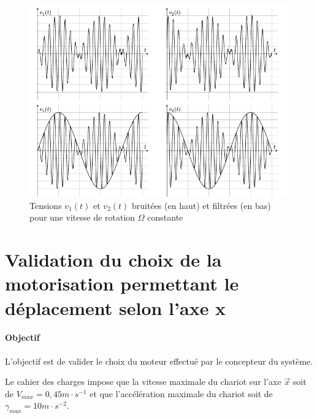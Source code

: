 \begin{figure}[!h]
\centering\includegraphics[width=0.7\linewidth]{img/fig12}
 \caption{Tensions $v_1(t)$ et $v_2(t)$ bruitées (en haut) et filtrées (en bas) pour une vitesse de rotation $\Omega$ constante}
 \label{img12}
\end{figure}



\section{Validation du choix de la motorisation permettant le déplacement selon l’axe x}

\paragraph{Objectif}

L’objectif est de valider le choix du moteur effectué par le concepteur du système.

Le cahier des charges impose que la vitesse maximale du chariot sur l’axe $\overrightarrow{x}$ soit de $V_{max}=0,45 m\cdot s^{-1}$ et que l’accélération maximale du chariot soit de $\gamma_{max}=10m\cdot s^{-2}$.

